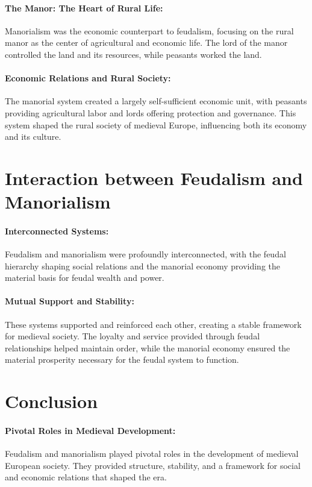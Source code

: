 \documentclass[a4paper,12pt]{book}
\begin{document}
\paragraph{The Manor: The Heart of Rural Life:}
Manorialism was the economic counterpart to feudalism, focusing on the rural manor as the center of agricultural and economic life. The lord of the manor controlled the land and its resources, while peasants worked the land.

\paragraph{Economic Relations and Rural Society:}
The manorial system created a largely self-sufficient economic unit, with peasants providing agricultural labor and lords offering protection and governance. This system shaped the rural society of medieval Europe, influencing both its economy and its culture.

\section*{Interaction between Feudalism and Manorialism}

\paragraph{Interconnected Systems:}
Feudalism and manorialism were profoundly interconnected, with the feudal hierarchy shaping social relations and the manorial economy providing the material basis for feudal wealth and power.

\paragraph{Mutual Support and Stability:}
These systems supported and reinforced each other, creating a stable framework for medieval society. The loyalty and service provided through feudal relationships helped maintain order, while the manorial economy ensured the material prosperity necessary for the feudal system to function.

\section*{Conclusion}

\paragraph{Pivotal Roles in Medieval Development:}
Feudalism and manorialism played pivotal roles in the development of medieval European society. They provided structure, stability, and a framework for social and economic relations that shaped the era.
\end{document}
